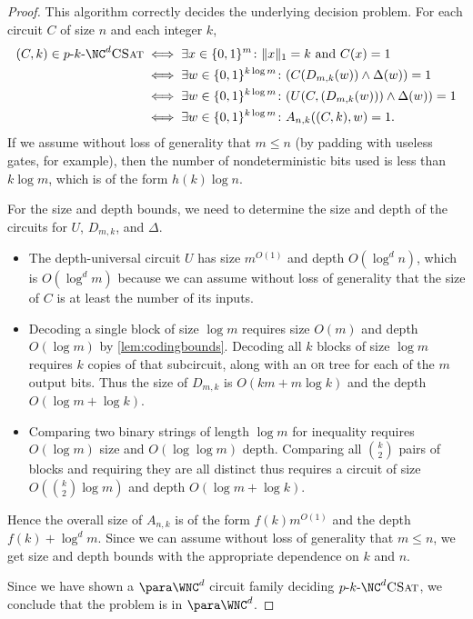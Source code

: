 \begin{proof}
  This algorithm correctly decides the underlying decision problem.
  For each circuit $C$ of size $n$ and each integer $k$,
  \begin{align*}
    (C, k) \in \pNCSAT & \iff \exists x \in \{0, 1\}^m \colon \|x\|_1 = k \text{ and } C(x) = 1 \\
    & \iff \exists w \in \{0, 1\}^{k \log m} \colon (C(D_{m, k}(w)) \land \Delta(w)) = 1 \\
    & \iff \exists w \in \{0, 1\}^{k \log m} \colon (U(C, (D_{m, k}(w))) \land \Delta(w)) = 1 \\
    & \iff \exists w \in \{0, 1\}^{k \log m} \colon A_{n, k}((C, k), w) = 1.
  \end{align*}
  If we assume without loss of generality that $m \leq n$ (by padding with useless gates, for example), then the number of nondeterministic bits used is less than $k \log m$, which is of the form $h(k) \log n$.

  For the size and depth bounds, we need to determine the size and depth of the circuits for $U$, $D_{m, k}$, and $\Delta$.
  \begin{itemize}
  \item The depth-universal circuit $U$ has size $m^{O(1)}$ and depth $O(\log^d n)$, which is $O(\log^d m)$ because we can assume without loss of generality that the size of $C$ is at least the number of its inputs.
  \item
    Decoding a single block of size $\log m$ requires size $O(m)$ and depth $O(\log m)$ by \autoref{lem:codingbounds}.
    Decoding all $k$ blocks of size $\log m$ requires $k$ copies of that subcircuit, along with an \textsc{or} tree for each of the $m$ output bits.
    Thus the size of $D_{m, k}$ is $O(k m + m \log k)$ and the depth $O(\log m + \log k)$.
  \item
    Comparing two binary strings of length $\log m$ for inequality requires $O(\log m)$ size and $O(\log \log m)$ depth.
    Comparing all $\binom{k}{2}$ pairs of blocks and requiring they are all distinct thus requires a circuit of size $O(\binom{k}{2} \log m)$ and depth $O(\log m + \log k)$.
  \end{itemize}
  Hence the overall size of $A_{n, k}$ is of the form $f(k) m^{O(1)}$ and the depth $f(k) + \log^d m$.
  Since we can assume without loss of generality that $m \leq n$, we get size and depth bounds with the appropriate dependence on $k$ and $n$.

  Since we have shown a $\para \WNC^d$ circuit family deciding $\pNCSAT$, we conclude that the problem is in $\para \WNC^d$.
\end{proof}

